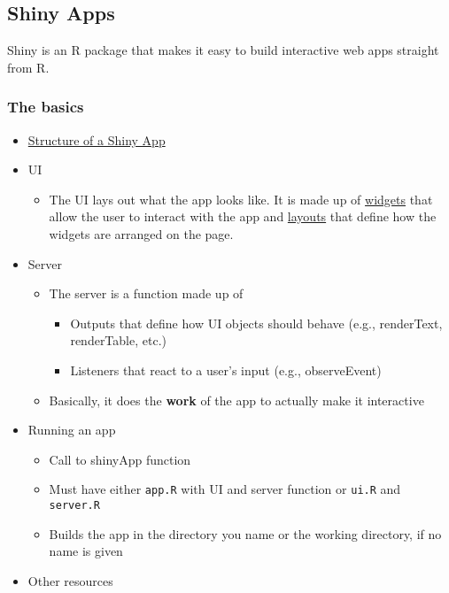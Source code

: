 \documentclass[]{article}
\providecommand{\tightlist}{%
  \setlength{\itemsep}{0pt}\setlength{\parskip}{0pt}}
\begin{document}
\hypertarget{shiny-apps}{\subsection{Shiny Apps}\label{shiny-apps}}

Shiny is an R package that makes it easy to build interactive web apps
straight from R.

\hypertarget{shiny-apps-overview}{\subsubsection{The
basics}\label{shiny-apps-overview}}

\begin{itemize}
\tightlist
\item
  \href{https://shiny.rstudio.com/tutorial/written-tutorial/lesson1/}{Structure
  of a Shiny App}
\item
  UI

  \begin{itemize}
  \tightlist
  \item
    The UI lays out what the app looks like. It is made up of
    \href{https://shiny.rstudio.com/gallery/widget-gallery.html}{widgets}
    that allow the user to interact with the app and
    \href{https://shiny.rstudio.com/articles/layout-guide.html}{layouts}
    that define how the widgets are arranged on the page.
  \end{itemize}
\item
  Server

  \begin{itemize}
  \tightlist
  \item
    The server is a function made up of

    \begin{itemize}
    \tightlist
    \item
      Outputs that define how UI objects should behave (e.g.,
      renderText, renderTable, etc.)
    \item
      Listeners that react to a user's input (e.g., observeEvent)
    \end{itemize}
  \item
    Basically, it does the \textbf{work} of the app to actually make it
    interactive
  \end{itemize}
\item
  Running an app

  \begin{itemize}
  \tightlist
  \item
    Call to shinyApp function
  \item
    Must have either \texttt{app.R} with UI and server function or
    \texttt{ui.R} and \texttt{server.R}
  \item
    Builds the app in the directory you name or the working directory,
    if no name is given
  \end{itemize}
\item
  Other resources


\end{itemize}
\end{document}

